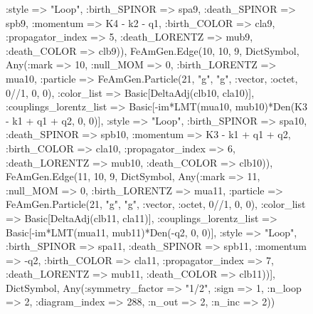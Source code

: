 \documentclass{revtex4}
\begin{document}
\begin{figure}[!htb]
\begin{center}
{:style => "Loop", :birth_SPINOR => spa9, :death_SPINOR => spb9, :momentum => K4 - k2 - q1, :birth_COLOR => cla9, :propagator_index => 5, :death_LORENTZ => mub9, :death_COLOR => clb9)), FeAmGen.Edge(10, 10, 9, Dict{Symbol, Any}(:mark => 10, :null_MOM => 0, :birth_LORENTZ => mua10, :particle => FeAmGen.Particle(21, "g", "g", :vector, :octet, 0//1, 0, 0), :color_list => Basic[DeltaAdj(clb10, cla10)], :couplings_lorentz_list => Basic[-im*LMT(mua10, mub10)*Den(K3 - k1 + q1 + q2, 0, 0)], :style => "Loop", :birth_SPINOR => spa10, :death_SPINOR => spb10, :momentum => K3 - k1 + q1 + q2, :birth_COLOR => cla10, :propagator_index => 6, :death_LORENTZ => mub10, :death_COLOR => clb10)), FeAmGen.Edge(11, 10, 9, Dict{Symbol, Any}(:mark => 11, :null_MOM => 0, :birth_LORENTZ => mua11, :particle => FeAmGen.Particle(21, "g", "g", :vector, :octet, 0//1, 0, 0), :color_list => Basic[DeltaAdj(clb11, cla11)], :couplings_lorentz_list => Basic[-im*LMT(mua11, mub11)*Den(-q2, 0, 0)], :style => "Loop", :birth_SPINOR => spa11, :death_SPINOR => spb11, :momentum => -q2, :birth_COLOR => cla11, :propagator_index => 7, :death_LORENTZ => mub11, :death_COLOR => clb11))], Dict{Symbol, Any}(:symmetry_factor => "1/2", :sign => 1, :n_loop => 2, :diagram_index => 288, :n_out => 2, :n_inc => 2)) 
}
\end{center}
\end{figure}
\end{document}
